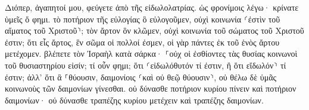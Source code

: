 \documentclass{openreader}
\begin{document}
Διόπερ, ἀγαπητοί μου, φεύγετε ἀπὸ τῆς εἰδωλολατρίας. 
ὡς φρονίμοις λέγω· κρίνατε ὑμεῖς ὅ φημι. 
τὸ ποτήριον τῆς εὐλογίας ὃ εὐλογοῦμεν, οὐχὶ κοινωνία ⸂ἐστὶν τοῦ αἵματος τοῦ Χριστοῦ⸃; τὸν ἄρτον ὃν κλῶμεν, οὐχὶ κοινωνία τοῦ σώματος τοῦ Χριστοῦ ἐστιν; 
ὅτι εἷς ἄρτος, ἓν σῶμα οἱ πολλοί ἐσμεν, οἱ γὰρ πάντες ἐκ τοῦ ἑνὸς ἄρτου μετέχομεν. 
βλέπετε τὸν Ἰσραὴλ κατὰ σάρκα· ⸀οὐχ οἱ ἐσθίοντες τὰς θυσίας κοινωνοὶ τοῦ θυσιαστηρίου εἰσίν; 
τί οὖν φημι; ὅτι ⸂εἰδωλόθυτόν τί ἐστιν, ἢ ὅτι εἴδωλόν⸃ τί ἐστιν; 
ἀλλ’ ὅτι ἃ ⸀θύουσιν, δαιμονίοις ⸂καὶ οὐ θεῷ θύουσιν⸃, οὐ θέλω δὲ ὑμᾶς κοινωνοὺς τῶν δαιμονίων γίνεσθαι. 
οὐ δύνασθε ποτήριον κυρίου πίνειν καὶ ποτήριον δαιμονίων· οὐ δύνασθε τραπέζης κυρίου μετέχειν καὶ τραπέζης δαιμονίων. 
\end{document}
